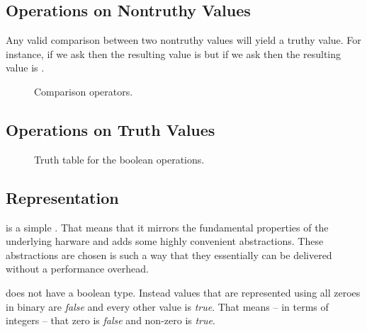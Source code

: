 
\subsection{Operations on Nontruthy Values}

Any valid comparison between two nontruthy values will yield a truthy value. For instance, if we ask  then the resulting value is  but if we ask  then the resulting value is .

\begin{figure}[tbp]
  
  \caption{Comparison operators.}
  \label{fig:prim:bool:comparison}
\end{figure}

\subsection{Operations on Truth Values}

\begin{figure}[tbp]
  
  \caption{Truth table for the boolean operations.}
  \label{fig:prim:bool:and}
\end{figure}


\subsection{Representation}


\csharpsubsection{\csharp}



 is a simple . That means that it mirrors the fundamental properties of the underlying harware and adds some highly convenient abstractions. These abstractions are chosen is such a way that they essentially can be delivered without a performance overhead.

 does not have a boolean type. Instead  values that are represented using all zeroes in binary are \textsl{false} and every other value is \textsl{true}. That means -- in terms of integers -- that zero is \textsl{false} and non-zero is \textsl{true}. %


